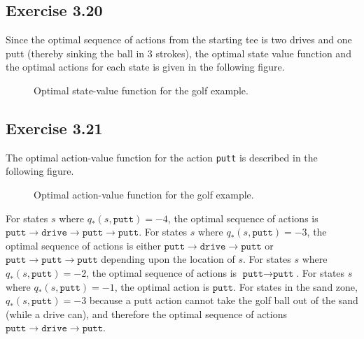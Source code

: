 \documentclass[10pt]{article}
\begin{document}
	\subsection*{Exercise 3.20}
	\label{ss:3.20}
	Since the optimal sequence of actions from the starting tee is two drives and one putt (thereby sinking the ball in 3 strokes), the optimal state value function and the optimal actions for each state is given in the following figure.
	\begin{figure}[H]
		\centering
		\caption{Optimal state-value function for the golf example.}
	\end{figure}
	\subsection*{Exercise 3.21}
	\label{ss:3.21}
	The optimal action-value function for the action \texttt{putt} is described in the following figure.
	\begin{figure}[H]
		\centering
		\caption{Optimal action-value function for the golf example.}
	\end{figure}
	\noindent
	 For states $s$ where $q_*(s,\texttt{putt})=-4$, the optimal sequence of actions is $\texttt{putt}\rightarrow\texttt{drive}\rightarrow\texttt{putt}\rightarrow\texttt{putt}$. For states $s$ where $q_*(s,\texttt{putt})=-3$, the optimal sequence of actions is either $\texttt{putt}\rightarrow\texttt{drive}\rightarrow\texttt{putt}$ or $\texttt{putt}\rightarrow\texttt{putt}\rightarrow\texttt{putt}$ depending upon the location of $s$. For states $s$ where $q_*(s,\texttt{putt})=-2$, the optimal sequence of actions is $\texttt{putt}\rightarrow\texttt{putt}$. For states $s$ where $q_*(s,\texttt{putt})=-1$, the optimal action is $\texttt{putt}$. For states in the sand zone, $q_*(s,\texttt{putt}) = -3$ because a putt action cannot take the golf ball out of the sand (while a drive can), and therefore the optimal sequence of actions $\texttt{putt}\rightarrow\texttt{drive}\rightarrow\texttt{putt}$.
\end{document}
